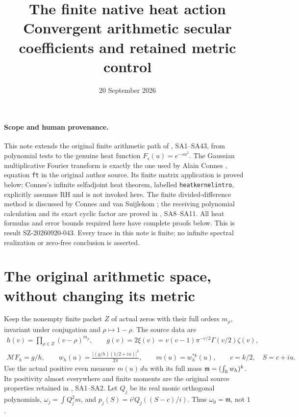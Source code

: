 \documentclass[11pt]{article}
\title{The finite native heat action\\
Convergent arithmetic secular coefficients and retained metric control}
\author{}\date{20 September 2026}
\begin{document}
\maketitle

\paragraph{Scope and human provenance.}
This note extends the original finite arithmetic path of
\cite{NativeAction}, SA1--SA43, from polynomial tests to the
genuine heat function \(F_s(u)=e^{-su^2}\).
The Gaussian multiplicative Fourier transform is exactly the
one used by Alain Connes \cite{ConnesHeat}, equation
\texttt{ft} in the original author source. Its finite matrix
application is proved below; Connes's infinite selfadjoint
heat theorem, labelled \texttt{heatkernelintro}, explicitly
assumes RH and is not invoked here.
The finite divided-difference method is discussed by Connes
and van Suijlekom \cite{CV}; the receiving polynomial
calculation and its exact cyclic factor are proved in
\cite{NativeAction}, SA8--SA11. All heat formulas and error
bounds required here have complete proofs below.
This is result SZ-20260920-043. Every trace in this note is
finite; no infinite spectral realization or zero-free
conclusion is asserted.

\section{The original arithmetic space, without changing its metric}

Keep the nonempty finite packet \(Z\) of actual zeros with
their full orders \(m_\rho\), invariant under conjugation
and \(\rho\mapsto1-\rho\). The source data are
\begin{equation}\tag{NH1}\label{NH1}
\begin{gathered}
h(v)=\prod_{\rho\in Z}(v-\rho)^{m_\rho},\qquad
g(v)=2\xi(v)=v(v-1)\pi^{-v/2}\Gamma(v/2)\zeta(v),\\
\mathcal M F_h=g/h,\qquad
w_h(u)=\frac{|(g/h)(1/2+iu)|^2}{2\pi},\qquad
m(u)=w_h^{*k}(u),\qquad c=k/2,\quad S=c+iu .
\end{gathered}
\end{equation}
Use the actual positive even measure \(m(u)\,du\) with
its full mass
\(\mathfrak m=(\int_\mathbb R w_h)^k\). Its positivity almost
everywhere and finite moments are the original source
properties retained in \cite{NativeAction}, SA1--SA2.
Let \(Q_j\) be its real monic orthogonal polynomials,
\(\omega_j=\int Q_j^2m\), and
\(p_j(S)=i^jQ_j((S-c)/i)\). Thus
\(\omega_0=\mathfrak m\), not \(1\).
\end{document}
